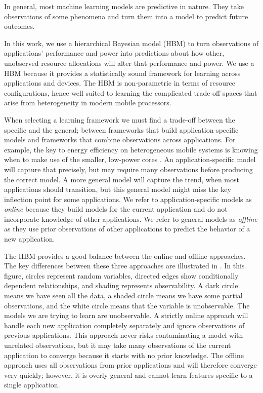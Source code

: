 In general, most machine learning models are predictive in nature. They take observations of some
phenomena and turn them into a model to predict future outcomes.  

In this work, we use a hierarchical Bayesian model (HBM) to turn
observations of applications' performance and power into predictions
about how other, unobserved resource allocations will alter that
performance and power.  We use a HBM because it provides a
statistically sound framework for learning across applications and
devices.  The HBM is non-parametric in terms of resource configurations, hence well suited to learning the complicated
trade-off spaces that arise from heterogeneity in modern mobile
processors.

When selecting a learning framework we must find a trade-off between
the specific and the general; \ie between frameworks that build
application-specific models and frameworks that combine observations
across applications.  For example, the key to energy efficiency on
heterogeneous mobile systems is knowing when to make use of the
smaller, low-power cores \cite{}.  An application-specific model will
capture that precisely, but may require many observations before
producing the correct model.  A more general model will capture the
trend, \eg when most applications should transition, but this general
model might miss the key inflection point for some applications.  We
refer to application-specific models as \emph{online} because they
build models for the current application and do not incorporate
knowledge of other applications.  We refer to general models as
\emph{offline} as they use prior observations of other applications to
predict the behavior of a new application.  

The HBM provides a good balance between the online and offline
approaches.  The key differences between these three approaches are
illustrated in . In this figure, circles
represent random variables, directed edges show conditionally
dependent relationships, and shading represents observability.  A dark
circle means we have seen all the data, a shaded circle means we have
some partial observations, and the white circle means that the
variable is unobservable.  The models we are trying to learn
are unobservable.  A strictly online approach will handle each new
application completely separately and ignore observations of previous
applications.  This approach never risks contaminating a model with
unrelated observations, but it may take many observations of the
current application to converge because it starts with no prior
knowledge. The offline approach uses all observations from prior
applications and will therefore converge very quickly; however, it is
overly general and cannot learn features specific to a single
application.

